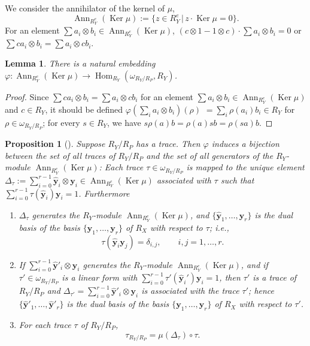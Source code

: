 \documentclass[10pt,a4paper]{amsart}
\def\bby{{\mathbf y}}
\def\hby{\widehat {{\mathbf y}}}
\def\Ker{\operatorname{Ker}}
\numberwithin{equation}{section}
\newtheorem{Lemma}[Theorem]{Lemma}
\newtheorem{Proposition}[Theorem]{Proposition}
 { \theoremstyle{definition}
\newtheorem{Definition}[Theorem]{Definition}
\newtheorem{Note}[Theorem]{Note}
\newtheorem{Example}[Theorem]{Example}
\newtheorem{Remark}[Theorem]{Remark} }
\begin{document}
We consider the annihilator of the kernel of $\mu$,
\[
\operatorname{Ann}_{R_Y^e}(\Ker \mu) :=\{ z\in R_Y^e\, |\, z\cdot \Ker \mu = 0\}.
\]
For an element $\sum a_i \otimes b_i \in\operatorname{Ann}_{R_Y^e}(\Ker \mu)$,
$(c \otimes 1-1 \otimes c)\cdot \sum a_i \otimes b_i =0$ or $\sum ca_i \otimes b_i =\sum a_i \otimes c b_i$.

\begin{Lemma}There is a natural embedding $\varphi\colon \operatorname{Ann}_{R_Y^e}(\Ker \mu)\to
\operatorname{Hom}_{R_Y}(\omega_{R_Y/R_P}, R_Y)$.
\end{Lemma}

\begin{proof}Since $\sum ca_i \otimes b_i =\sum a_i \otimes c b_i$ for an element $\sum a_i \otimes b_i \in\operatorname{Ann}_{R_Y^e}(\Ker \mu)$ and $c\in R_Y$, it should be defined
$\varphi(\sum_i a_i \otimes b_i)(\rho)$ $=\sum_i\rho(a_i) b_i\in R_Y$ for $\rho\in \omega_{R_Y/R_P}$;
for every $s\in R_Y$, we have $s \rho(a) b=\rho(a) s b=\rho(s a)b$.
\end{proof}

\begin{Proposition}[{\cite[Corollary H.20]{Kunz2004}}]\label{2pr:A_traceH20}
Suppose $R_Y/R_P$ has a trace.
Then $\varphi$ induces a bijection between the set of all traces of $R_Y/R_P$ and the set of all generators of the $R_Y$-module $\operatorname{Ann}_{R_Y^e}(\Ker \mu)$:
Each trace $\tau \in \omega_{R_Y/R_P}$ is mapped to the unique element $\Delta_\tau:=\sum_{i=0}^{r-1} \hby_i\otimes\bby_i \in \operatorname{Ann}_{R_Y^e}(\Ker \mu)$ associated with $\tau$ such that $\sum_{i=0}^{r-1}\tau( \hby_i)\bby_i =1$.
Furthermore

\begin{enumerate}\itemsep=0pt
\item[$1.$] $\Delta_\tau$ generates the $R_Y$-module $\operatorname{Ann}_{R_Y^e}(\Ker \mu)$, and $\{\hby_1, \dots, \hby_r\}$ is the dual basis of the basis $\{\bby_1, \dots, \bby_r\}$ of $R_X$ with respect to $\tau$; i.e.,
\[
\tau(\hby_i\bby_j)=\delta_{i,j}, \qquad i,j = 1, \dots, r.
\]
\item[$2.$] If $\sum_{i=0}^{r-1} \hby'_i \otimes \bby_i$ generates the $R_Y$-module $\operatorname{Ann}_{R_Y^e}(\Ker \mu)$, and if $\tau' \in \omega_{R_Y/R_P}$ is a linear form with $\sum_{i=0}^{r-1}\tau'( \hby_i')\bby_i =1$, then $\tau'$ is a trace of $R_Y/R_P$ and $\Delta_{\tau'}=\sum_{i=0}^{r-1} \hby'_i \otimes \bby_i$ is associated with the trace $\tau'$; hence $\{\hby'_1, \dots, \hby'_r\}$ is the dual basis of the basis $\{\bby_1, \dots, \bby_r\}$ of $R_X$ with respect to $\tau'$.

\item[$3.$] For each trace $\tau$ of $R_Y/R_P$,
\[
\tau_{R_Y/R_P} = \mu(\Delta_\tau)\circ \tau.
\]
\end{enumerate}
\end{Proposition}
\end{document}
